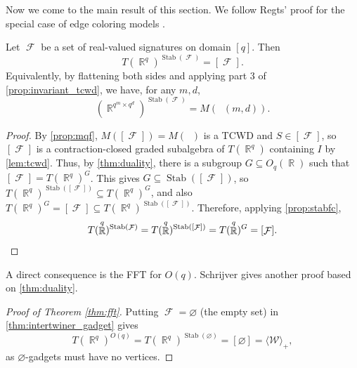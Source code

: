 \documentclass{theoretics}
\DeclareMathOperator{\rr}{\mathbb{R}}
\DeclareMathOperator{\fc}{\mathcal{F}}
\DeclareMathOperator{\qk}{\mathfrak{Q}_{\mathcal{F}}}
\DeclareMathOperator{\stab}{Stab}
\begin{document}
Now we come to the main result of this section. We follow Regts' proof
for the special case of edge coloring models \cite[Theorem 6.8]{regts}.
\begin{theorem}
    \label{thm:intertwiner_gadget}
    Let $\fc$ be a set of real-valued signatures on domain $[q]$. Then
    \[
        T(\rr^q)^{\stab(\fc)} = [\fc].
    \]
    Equivalently, by flattening both sides and applying part 3 of \autoref{prop:invariant_tcwd},
    we have, for any $m,d$,
    \[
        \left(\rr^{q^m\times q^d}\right)^{\stab(\fc)} = M(\qk(m,d)).
    \]
\end{theorem}
\begin{proof}
    By \autoref{prop:mqf}, $M([\fc]) = M(\qk)$ is a TCWD and
    $S \in [\fc]$, so $[\fc]$ is a contraction-closed
    graded subalgebra of $T(\rr^q)$ containing $I$ by \autoref{lem:tcwd}. Thus, by \autoref{thm:duality},
    there is a subgroup $G \subseteq O_q(\rr)$ such that $[\fc] = T(\rr^q)^G$.
    This gives $G \subseteq \stab([\fc])$, so $T(\rr^q)^{\stab([\fc])} \subseteq T(\rr^q)^G$, and 
    also $T(\rr^q)^G = [\fc] \subseteq T(\rr^q)^{\stab([\fc])}$. Therefore,
    applying \autoref{prop:stabfc},
    \[
        T(\rr^q)^{\stab(\fc)} = T(\rr^q)^{\stab([\fc])} = T(\rr^q)^G = [\fc].
        \qedhere
    \]
\end{proof}
A direct consequence is the FFT for $O(q)$. Schrijver \cite{schrijver_tensor_2008} gives another 
proof based on \autoref{thm:duality}.
\begin{proof}[Proof of Theorem \ref{thm:fft}]
    Putting $\fc = \varnothing$ (the empty set) in \autoref{thm:intertwiner_gadget} gives
    \[
        T(\rr^q)^{O(q)} = T(\rr^q)^{\stab(\varnothing)} = [\varnothing] = \langle \mathcal{W} \rangle_+,
    \]
    as $\varnothing$-gadgets must have no vertices.
\end{proof}
\end{document}
